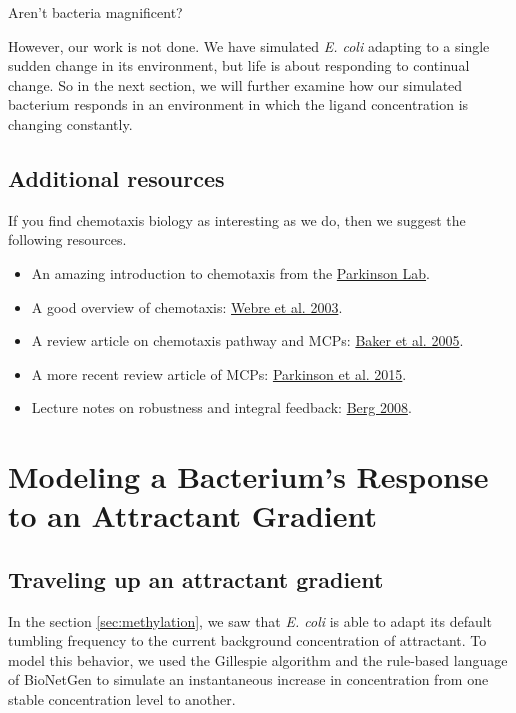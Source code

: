 Aren't bacteria magnificent?

However, our work is not done. We have simulated \textit{E. coli} adapting to a single sudden change in its environment, but life is about responding to continual change. So in the next section, we will further examine how our simulated bacterium responds in an environment in which the ligand concentration is changing constantly.


\FloatBarrier
{}
\subsection{Additional resources}

If you find chemotaxis biology as interesting as we do, then we suggest the following resources.
\begin{itemize}
 \item An amazing introduction to chemotaxis from the \href{http://chemotaxis.biology.utah.edu/Parkinson_Lab/projects/ecolichemotaxis/ecolichemotaxis.html}{Parkinson Lab}.
 \item A good overview of chemotaxis: \href{https://doi.org/10.1016/S0960-9822(02)01424-0)}{Webre et al. 2003}.
 \item A review article on chemotaxis pathway and MCPs: \href{https://pubmed.ncbi.nlm.nih.gov/16369945}{Baker et al. 2005}.
 \item A more recent review article of MCPs: \href{https://www.sciencedirect.com/science/article/abs/pii/S0966842X15000578}{Parkinson et al. 2015}.
 \item Lecture notes on robustness and integral feedback: \href{https://www.weizmann.ac.il/mcb/UriAlon/sites/mcb.UriAlon/files/uploads/lecture_notes_-_robustness_in_bacterial_chemotaxis_.pdf}{Berg 2008}.
\end{itemize}


\FloatBarrier
{}

\section{Modeling a Bacterium's Response to an Attractant Gradient}
\label{sec:gradient}

\subsection{Traveling up an attractant gradient}


In the section \autoref{sec:methylation}, we saw that \textit{E. coli} is able to adapt its default tumbling frequency to the current background concentration of attractant. To model this behavior, we used the Gillespie algorithm and the rule-based language of BioNetGen to simulate an instantaneous increase in concentration from one stable concentration level to another.

